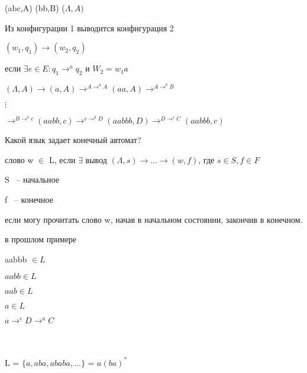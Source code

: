 \documentclass[russian]{lecture-notes}
\begin{document}
\begin{example}
(abc,A)
(bb,B)
($\Lambda,A)$
\end{example}

\begin{definition}
Из конфигурации 1 выводится конфигурация 2

$(w_{1}, q_{1}) \rightarrow (w_{2},q_{2})$

если $\exists e \in E: q_{1} \rightarrow^{a} q_{2} $ и $W_{2} = w_{1}a$

\end{definition}

\begin{example}
$(\Lambda,A) \rightarrow (a,A) \rightarrow^{A \rightarrow^{a} A} (aa,A) \rightarrow^{A \rightarrow^{b} B} $

\qquad \qquad $\vdots$

$\rightarrow^{B \rightarrow^{b} c} (aabb,c) \rightarrow^{c \rightarrow^{b} D} (aabbb,D) \rightarrow^{D \rightarrow^{\epsilon} C} (aabbb,c) $

\end{example}

\begin{definition}
Какой язык задает конечный автомат?

слово w $\in$ L, если $\exists $ вывод $(\Lambda,s) \rightarrow \dots \rightarrow (w,f) $, где $s \in S, f \in F$
\end{definition}

S ~-- начальное

f ~-- конечное

если могу прочитать слово w, начав  в начальном состоянии, закончив в конечном.

\begin{definition}
в прошлом примере 

aabbb $\in L$

$aabb \in L$

$aab \in L$

$a \in L$

$a \rightarrow^{\epsilon} D \rightarrow^{a} C $
\end{definition}

\begin{example}

$ $

$ $

$ $
\usetikzlibrary{shapes.geometric}

L = $\{ a,aba,ababa,\dots \}$ = $a(ba)^{*}$
\end{example}
\end{document}
